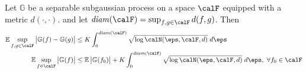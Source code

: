 \begin{theorem}
	\label{thm:vdv2.2.4}
	Let \(\mathbb{G}\) be a separable subgaussian process on a space \(\calF\) equipped with a metric  \(d(\cdot,\cdot)\). and let \(\text{\emph{diam}}(\calF) = \sup_{f,g\in\calF}d(f,g) \). Then
	\begin{align}
		\label{eq:vdv2.2.4-1}
		\E\sup_{f,g\in\calF}\left|\mathbb{G}(f)-\mathbb{G}(g)\right|
		&\leq K \int_{0}^{\text{\emph{diam}}(\calF)} \sqrt{\log \calN(\eps, \calF, d)}\;d\eps \\
		\label{eq:vdv2.2.4-2}
		\E\sup_{f\in\calF}\left|\mathbb{G}(f)\right| &\leq \E\left|\mathbb{G}(f_0)\right| + K \int_{0}^{\text{\emph{diam}}(\calF)} \sqrt{\log \calN(\eps, \calF, d)}\;d\eps,\hbox{ }\forall f_0\in\calF
	\end{align}
\end{theorem}

